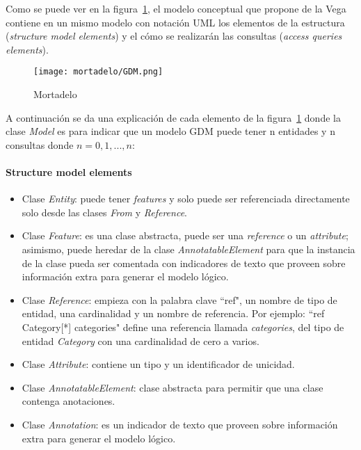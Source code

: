 Como se puede ver en la figura~\ref{img:mortadelo-gdm}, el modelo conceptual que propone de la Vega contiene en un mismo modelo con notación UML los elementos de la estructura (\textit{structure model elements}) y el cómo se realizarán las consultas (\textit{access queries elements}).


\begin{figure}[h!t] 
    \centering
    \texttt{[image: mortadelo/GDM.png]}
    \caption{Mortadelo}
    \label{img:mortadelo-gdm}
\end{figure}

A continuación se da una explicación de cada elemento de la figura~\ref{img:mortadelo-gdm} donde la clase \textit{Model} es para indicar que un modelo GDM puede tener n entidades y n consultas donde $n=0,1,...,n$:

\paragraph*{Structure model elements}


\begin{itemize}    
    
    \item Clase \textit{Entity}: puede tener \textit{features} y solo puede ser referenciada directamente solo desde las clases \textit{From} y \textit{Reference}.
    \item Clase \textit{Feature}: es una clase abstracta, puede ser una \textit{reference} o un \textit{attribute}; asimismo, puede heredar de la clase \textit{AnnotatableElement} para que la instancia de la clase pueda ser comentada con indicadores de texto que proveen sobre información extra para generar el modelo lógico. 
    \item Clase \textit{Reference}: empieza con la palabra clave ``ref", un nombre de tipo de entidad, una cardinalidad y un nombre de referencia. Por ejemplo: ``ref Category[*] categories" define una referencia llamada \textit{categories}, del tipo de entidad \textit{Category} con una cardinalidad de cero a varios.
    \item Clase \textit{Attribute}: contiene un tipo y un identificador de unicidad.
    \item Clase \textit{AnnotatableElement}: clase abstracta para permitir que una clase contenga anotaciones.
    \item Clase \textit{Annotation}: es un indicador de texto que proveen sobre información extra para generar el modelo lógico.
    
\end{itemize}

